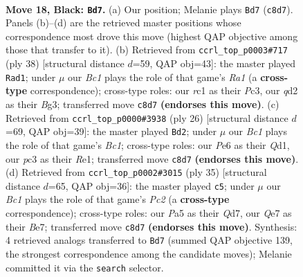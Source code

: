 \documentclass[11pt]{article}
\begin{document}
\clearpage

\begin{figure}[p]\centering
\begin{subfigure}{0.46\textwidth}\centering
\resizebox{\linewidth}{!}{%
\newchessgame
\chessboard[
  setfen={r1br2k1/1p2qppp/2n1p3/p1Pp4/3P4/P1P2N1P/R2QBPP1/2R3K1 b - - 3 18},
  showmover=false,
  pgfstyle=straightmove, color=movearrow, markmove={c8-d7}
]}
\caption{}
\end{subfigure}\hfill
\begin{subfigure}{0.46\textwidth}\centering
\resizebox{\linewidth}{!}{%
\newchessgame
\chessboard[
  setfen={r2q2k1/1bpn1rpp/5p2/1p6/p1p1P3/2P1N1B1/PPQ2PPP/R4RK1 w - - 0 20},
  showmover=false,
  pgfstyle=straightmove, color=movearrow, markmove={a1-d1}
]}
\caption{}
\end{subfigure}
\\[4pt]
\begin{subfigure}{0.46\textwidth}\centering
\resizebox{\linewidth}{!}{%
\newchessgame
\chessboard[
  setfen={r4rk1/pp1qb1pp/3ppn2/2p5/P2pPP2/3P1N2/1PP3PP/R1BQR1K1 w - - 0 14},
  showmover=false,
  pgfstyle=straightmove, color=movearrow, markmove={c1-d2}
]}
\caption{}
\end{subfigure}\hfill
\begin{subfigure}{0.46\textwidth}\centering
\resizebox{\linewidth}{!}{%
\newchessgame
\chessboard[
  setfen={4r1k1/1rpqbppp/3pn3/1p2p3/4P2P/2PPBN2/1P3PP1/R2QR1K1 b - - 1 18},
  showmover=false,
  pgfstyle=straightmove, color=movearrow, markmove={c7-c5}
]}
\caption{}
\end{subfigure}
\caption{\textbf{Move 18, Black: \texttt{Bd7}.} (a) Our position; Melanie plays \texttt{Bd7} (\texttt{c8d7}). Panels (b)--(d) are the retrieved master positions whose correspondence most drove this move (highest QAP objective among those that transfer to it). (b) Retrieved from \texttt{ccrl\_top\_p0003\#717} (ply 38) [structural distance $d$=59, QAP obj=43]: the master played \texttt{Rad1}; under $\mu$ our \emph{Bc1} plays the role of that game's \emph{Ra1} (a \textbf{cross-type} correspondence); cross-type roles: our \emph{r}c1 as their \emph{P}c3, our \emph{q}d2 as their \emph{B}g3; transferred move \texttt{c8d7} \textbf{(endorses this move)}. (c) Retrieved from \texttt{ccrl\_top\_p0000\#3938} (ply 26) [structural distance $d$=69, QAP obj=39]: the master played \texttt{Bd2}; under $\mu$ our \emph{Bc1} plays the role of that game's \emph{Bc1}; cross-type roles: our \emph{P}e6 as their \emph{Q}d1, our \emph{p}c3 as their \emph{R}e1; transferred move \texttt{c8d7} \textbf{(endorses this move)}. (d) Retrieved from \texttt{ccrl\_top\_p0002\#3015} (ply 35) [structural distance $d$=65, QAP obj=36]: the master played \texttt{c5}; under $\mu$ our \emph{Bc1} plays the role of that game's \emph{Pc2} (a \textbf{cross-type} correspondence); cross-type roles: our \emph{P}a5 as their \emph{Q}d7, our \emph{Q}e7 as their \emph{B}e7; transferred move \texttt{c8d7} \textbf{(endorses this move)}. Synthesis: 4 retrieved analogs transferred to \texttt{Bd7} (summed QAP objective 139, the strongest correspondence among the candidate moves); Melanie committed it via the \texttt{search} selector.}
\label{fig:thought-m35}
\end{figure}
\end{document}
